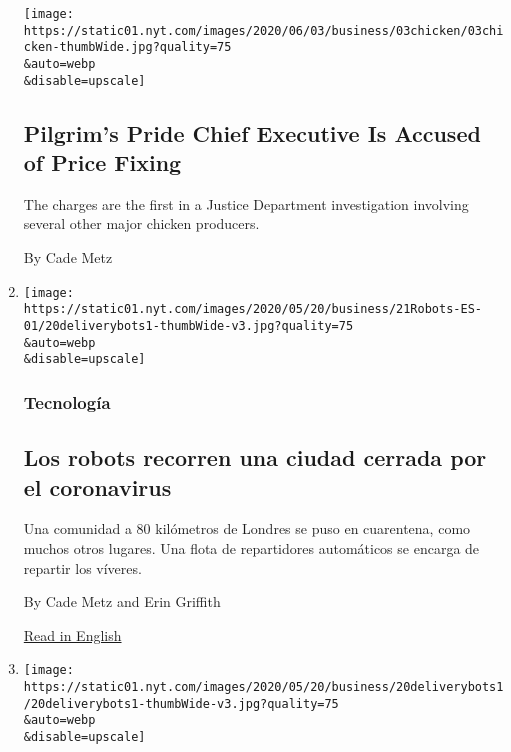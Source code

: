 \begin{enumerate}
  \texttt{[image: https://static01.nyt.com/images/2020/06/03/business/03chicken/03chicken-thumbWide.jpg?quality=75\\\&auto=webp\\\&disable=upscale]}

  \hypertarget{pilgrims-pride-chief-executive-is-accused-of-price-fixing}{%
  \subsection{Pilgrim's Pride Chief Executive Is Accused of Price
  Fixing}\label{pilgrims-pride-chief-executive-is-accused-of-price-fixing}}

  The charges are the first in a Justice Department investigation
  involving several other major chicken producers.

  By Cade Metz
\item
  \href{/es/2020/05/21/espanol/ciencia-y-tecnologia/pandemia-robots-delivery.html}{}

  \texttt{[image: https://static01.nyt.com/images/2020/05/20/business/21Robots-ES-01/20deliverybots1-thumbWide-v3.jpg?quality=75\\\&auto=webp\\\&disable=upscale]}

  \hypertarget{tecnologuxeda}{%
  \subsubsection{Tecnología}\label{tecnologuxeda}}

  \hypertarget{los-robots-recorren-una-ciudad-cerrada-por-el-coronavirus}{%
  \subsection{Los robots recorren una ciudad cerrada por el
  coronavirus}\label{los-robots-recorren-una-ciudad-cerrada-por-el-coronavirus}}

  Una comunidad a 80 kilómetros de Londres se puso en cuarentena, como
  muchos otros lugares. Una flota de repartidores automáticos se encarga
  de repartir los víveres.

  By Cade Metz and Erin Griffith

  \href{https://www.nytimes.com/2020/05/20/technology/delivery-robots-coronavirus-milton-keynes.html}{Read
  in English}
\item
  \href{/2020/05/20/technology/delivery-robots-coronavirus-milton-keynes.html}{}

  \texttt{[image: https://static01.nyt.com/images/2020/05/20/business/20deliverybots1/20deliverybots1-thumbWide-v3.jpg?quality=75\\\&auto=webp\\\&disable=upscale]}


\end{enumerate}
